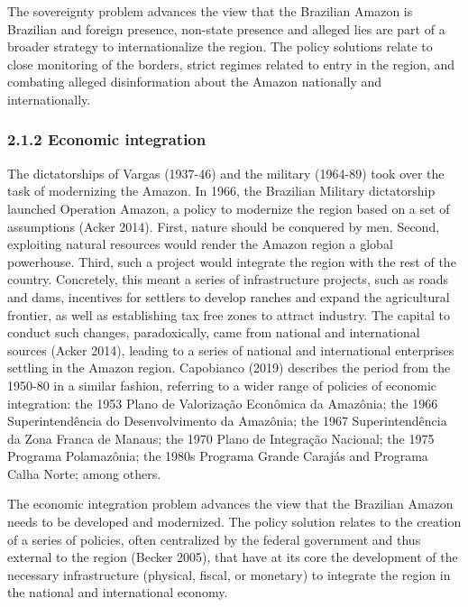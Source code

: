 \documentclass[
]{article}
\begin{document}
The sovereignty problem advances the view that the Brazilian Amazon is
Brazilian and foreign presence, non-state presence and alleged lies are
part of a broader strategy to internationalize the region. The policy
solutions relate to close monitoring of the borders, strict regimes
related to entry in the region, and combating alleged disinformation
about the Amazon nationally and internationally.

\hypertarget{economic-integration}{%
\subsubsection{2.1.2 Economic integration}\label{economic-integration}}

The dictatorships of Vargas (1937-46) and the military (1964-89) took
over the task of modernizing the Amazon. In 1966, the Brazilian Military
dictatorship launched Operation Amazon, a policy to modernize the region
based on a set of assumptions (Acker 2014). First, nature should be
conquered by men. Second, exploiting natural resources would render the
Amazon region a global powerhouse. Third, such a project would integrate
the region with the rest of the country. Concretely, this meant a series
of infrastructure projects, such as roads and dams, incentives for
settlers to develop ranches and expand the agricultural frontier, as
well as establishing tax free zones to attract industry. The capital to
conduct such changes, paradoxically, came from national and
international sources (Acker 2014), leading to a series of national and
international enterprises settling in the Amazon region. Capobianco
(2019) describes the period from the 1950-80 in a similar fashion,
referring to a wider range of policies of economic integration: the 1953
Plano de Valorização Econômica da Amazônia; the 1966 Superintendência do
Desenvolvimento da Amazônia; the 1967 Superintendência da Zona Franca de
Manaus; the 1970 Plano de Integração Nacional; the 1975 Programa
Polamazônia; the 1980s Programa Grande Carajás and Programa Calha Norte;
among others.

The economic integration problem advances the view that the Brazilian
Amazon needs to be developed and modernized. The policy solution relates
to the creation of a series of policies, often centralized by the
federal government and thus external to the region (Becker 2005), that
have at its core the development of the necessary infrastructure
(physical, fiscal, or monetary) to integrate the region in the national
and international economy.
\end{document}
